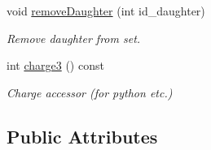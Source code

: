 \begin{DoxyCompactItemize}
void \hyperlink{class_d_d4hep_1_1_simulation_1_1_geant4_particle_a2a31cd8bf99c6073484ff0750c38b67c}{remove\+Daughter} (int id\+\_\+daughter)
\begin{DoxyCompactList}\small\item\em Remove daughter from set. \end{DoxyCompactList}\item 
int \hyperlink{class_d_d4hep_1_1_simulation_1_1_geant4_particle_ab910dfade46cbc27aa461124a10384cd}{charge3} () const
\begin{DoxyCompactList}\small\item\em Charge accessor (for python etc.) \end{DoxyCompactList}\end{DoxyCompactItemize}
\subsection*{Public Attributes}

